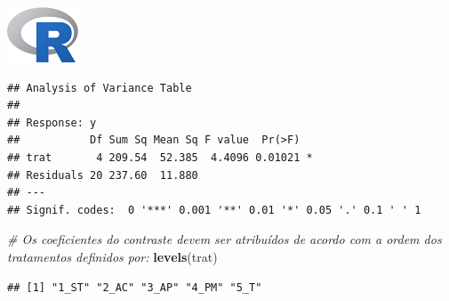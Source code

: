 \documentclass[
]{book}
\newenvironment{Shaded}{\begin{snugshade}}{\end{snugshade}}
\newcommand{\CharTok}[1]{\textcolor[rgb]{0.31,0.60,0.02}{#1}}
\newcommand{\CommentTok}[1]{\textcolor[rgb]{0.56,0.35,0.01}{\textit{#1}}}
\newcommand{\DataTypeTok}[1]{\textcolor[rgb]{0.13,0.29,0.53}{#1}}
\newcommand{\KeywordTok}[1]{\textcolor[rgb]{0.13,0.29,0.53}{\textbf{#1}}}
\newcommand{\NormalTok}[1]{#1}
\newcommand{\OperatorTok}[1]{\textcolor[rgb]{0.81,0.36,0.00}{\textbf{#1}}}
\newcommand{\StringTok}[1]{\textcolor[rgb]{0.31,0.60,0.02}{#1}}
\begin{document}
\includegraphics{Rlogo.png}

\begin{Shaded}
\end{Shaded}

\begin{verbatim}
## Analysis of Variance Table
## 
## Response: y
##           Df Sum Sq Mean Sq F value  Pr(>F)  
## trat       4 209.54  52.385  4.4096 0.01021 *
## Residuals 20 237.60  11.880                  
## ---
## Signif. codes:  0 '***' 0.001 '**' 0.01 '*' 0.05 '.' 0.1 ' ' 1
\end{verbatim}

\begin{Shaded}
\begin{Highlighting}[]
\CommentTok{# Os coeficientes do contraste devem ser atribuídos de acordo com a ordem dos tratamentos definidos por:}
\KeywordTok{levels}\NormalTok{(trat)}
\end{Highlighting}
\end{Shaded}

\begin{verbatim}
## [1] "1_ST" "2_AC" "3_AP" "4_PM" "5_T"
\end{verbatim}
\end{document}
